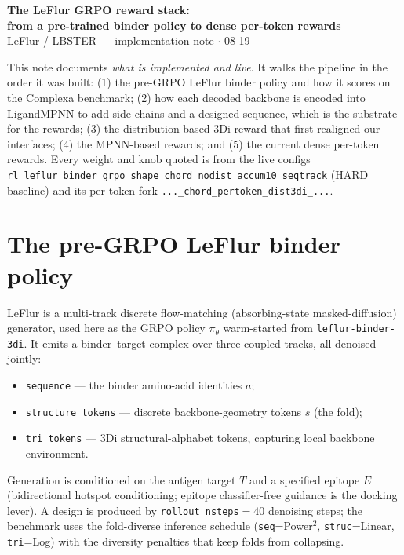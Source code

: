 \documentclass[11pt]{article}
\newcommand{\ttk}[1]{\texttt{\small #1}}
\begin{document}
\begin{center}
{\Large\bfseries The LeFlur GRPO reward stack:\\[2pt]
from a pre-trained binder policy to dense per-token rewards}\\[4pt]
{\normalsize LeFlur / LBSTER --- implementation note \quad$\cdot$-08-19}
\end{center}

\vspace{0.4em}

This note documents \emph{what is implemented and live}. It walks the pipeline in the order it
was built: (1) the pre-GRPO LeFlur binder policy and how it scores on the Complexa benchmark;
(2) how each decoded backbone is encoded into LigandMPNN to add side chains and a designed
sequence, which is the substrate for the rewards; (3) the distribution-based 3Di reward that
first realigned our interfaces; (4) the MPNN-based rewards; and (5) the current dense per-token
rewards. Every weight and knob quoted is from the live configs
\ttk{rl\_leflur\_binder\_grpo\_shape\_chord\_nodist\_accum10\_seqtrack} (HARD baseline) and its
per-token fork \ttk{...\_chord\_pertoken\_dist3di\_...}.

\section{The pre-GRPO LeFlur binder policy}
LeFlur is a multi-track discrete flow-matching (absorbing-state masked-diffusion) generator,
used here as the GRPO policy $\pi_\theta$ warm-started from \ttk{leflur-binder-3di}. It emits a
binder--target complex over three coupled tracks, all denoised jointly:
\begin{itemize}
\item \ttk{sequence} --- the binder amino-acid identities $a$;
\item \ttk{structure\_tokens} --- discrete backbone-geometry tokens $s$ (the fold);
\item \ttk{tri\_tokens} --- 3Di structural-alphabet tokens, capturing local backbone
  environment.
\end{itemize}
Generation is conditioned on the antigen target $T$ and a specified epitope $E$ (bidirectional
hotspot conditioning; epitope classifier-free guidance is the docking lever). A design is
produced by \ttk{rollout\_nsteps}$=40$ denoising steps; the benchmark uses the fold-diverse
inference schedule (\ttk{seq}=Power$^2$, \ttk{struc}=Linear, \ttk{tri}=Log) with the diversity
penalties that keep folds from collapsing.
\end{document}
